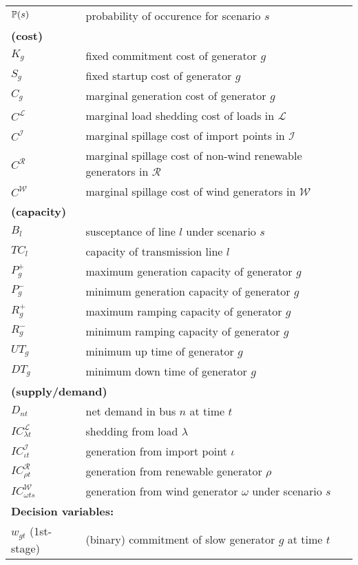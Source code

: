 \begin{table}[H]
{\begin{tabular}{ll}
			$\operatorname*{\mathbb{P}}(s)$	&probability of occurence for scenario $s$\\
			\multicolumn{2}{l}{\textbf{(cost)}} \\
			$K_g$ & fixed commitment cost of generator $g$ \\
			$S_g$ & fixed startup cost of generator $g$\\
			$C_g$ & marginal generation cost of generator $g$	\\
			$C^\mathcal{L}$ & marginal load shedding cost of loads in $\mathcal{L}$	\\
			$C^\mathcal{I}$ & marginal spillage cost of import points in $\mathcal{I}$ \\
			$C^\mathcal{R}$ & marginal spillage cost of non-wind  renewable generators in $\mathcal{R}$ \\ 
			$C^\mathcal{W}$ & marginal spillage cost of wind generators in $\mathcal{W}$ \\
			\multicolumn{2}{l}{\textbf{(capacity)}} \\
			$B_{l}$ & susceptance of line $l$ under scenario $s$\\
			$TC_l$ & capacity of transmission line $l$\\
			$P_{g}^+$ & maximum generation capacity of generator $g$\\
			$P_{g}^-$ & minimum generation capacity of generator $g$ \\
			$R_{g}^+$ & maximum ramping capacity of generator $g$\\
			$R_{g}^-$ & minimum ramping capacity of generator $g$\\
			$UT_{g}$ & minimum up time of generator $g$\\
			$DT_{g}$ & minimum down time of generator $g$\\
			\multicolumn{2}{l}{\textbf{(supply/demand)}} \\
			$D_{nt}$ & net demand in bus $n$ at time $t$ \\
			$IC_{\lambda t}^\mathcal{L}$ & shedding from load $\lambda$\\
			$IC_{\iota t}^\mathcal{I}$ & generation from import point $\iota$\\
			$IC_{\rho t}^\mathcal{R}$ & generation from renewable generator $\rho$\\
			$IC_{\omega ts}^\mathcal{W}$ & generation from wind generator $\omega$ under scenario $s$\\ \midrule
			\multicolumn{2}{l}{\textbf{Decision variables:}} \\
			$w_{gt}$ (1st-stage) 	& (binary) commitment of slow generator $g$ at time $t$\\

\end{tabular}}
\end{table}
